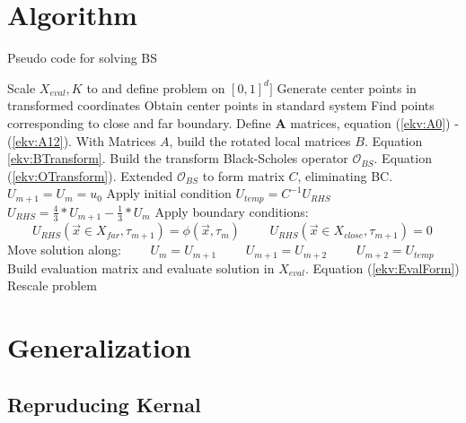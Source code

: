 \documentclass[a4paper]{article}      %
\begin{document}
\section*{Algorithm}
\begin{algorithm}[H]
    \centering
    \caption{Pseudo code for solving BS}
    \begin{algorithmic}[1]
    		\State Scale ${X}_{eval}, K$ to and define problem on $[0, 1]^d]$
    		\State Generate center points in transformed coordinates
    		\State Obtain center points in standard system
    		\State Find points corresponding to close and far boundary. 
		\State Define $\mathbf{A}$ matrices, equation (\ref{ekv:A0}) - (\ref{ekv:A12}).     
        \State With Matrices $A$, build the rotated local matrices $B$. Equation \ref{ekv:BTransform}.
        \State Build the transform Black-Scholes operator $\mathcal{O}_{BS}$. Equation (\ref{ekv:OTransform}).
        \State Extended $\mathcal{O}_{BS}$ to form matrix $C$, eliminating BC. $U_{m+1} = U_{m} = u_0$
        \State Apply initial condition 
        \State $U_{temp} = C^{-1}U_{RHS}$
        \State $U_{RHS} = \frac{4}{3}*U_{m+1} - \frac{1}{3}*U_{m}$
        \State Apply boundary conditions: 
        \State $\qquad U_{RHS}(\vec{x}\in X_{far}, \tau_{m+1}) = \phi(\vec{x}, \tau_m)$
        \State $\qquad U_{RHS}(\vec{x}\in X_{close}, \tau_{m+1}) = 0$
        \State Move solution along:
        \State $\qquad U_{m} = U_{m+1}$
        \State $\qquad U_{m+1} = U_{m+2}$
        \State $\qquad U_{m+2} = U_{temp}$
        \EndFor
    \State Build evaluation matrix and evaluate solution in $X_{eval}$. Equation (\ref{ekv:EvalForm})
    \State Rescale problem
    \end{algorithmic}
        \label{alg:1}
\end{algorithm}


\section*{Generalization}

\subsection*{Repruducing Kernal}
\end{document}
